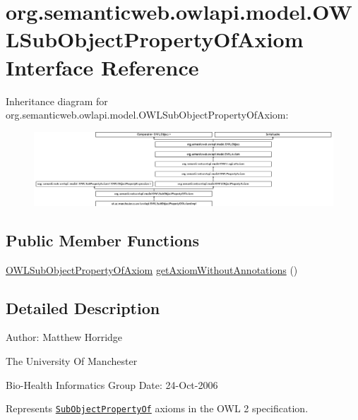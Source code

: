 \hypertarget{interfaceorg_1_1semanticweb_1_1owlapi_1_1model_1_1_o_w_l_sub_object_property_of_axiom}{\section{org.\-semanticweb.\-owlapi.\-model.\-O\-W\-L\-Sub\-Object\-Property\-Of\-Axiom Interface Reference}
\label{interfaceorg_1_1semanticweb_1_1owlapi_1_1model_1_1_o_w_l_sub_object_property_of_axiom}
}
Inheritance diagram for org.\-semanticweb.\-owlapi.\-model.\-O\-W\-L\-Sub\-Object\-Property\-Of\-Axiom\-:\begin{figure}[H]
\begin{center}
\leavevmode
\includegraphics[height=2.780881cm]{interfaceorg_1_1semanticweb_1_1owlapi_1_1model_1_1_o_w_l_sub_object_property_of_axiom}
\end{center}
\end{figure}
\subsection*{Public Member Functions}
\begin{DoxyCompactItemize}
\item 
\hyperlink{interfaceorg_1_1semanticweb_1_1owlapi_1_1model_1_1_o_w_l_sub_object_property_of_axiom}{O\-W\-L\-Sub\-Object\-Property\-Of\-Axiom} \hyperlink{interfaceorg_1_1semanticweb_1_1owlapi_1_1model_1_1_o_w_l_sub_object_property_of_axiom_a7bda39f827be3254b1de75b8fe1cfc08}{get\-Axiom\-Without\-Annotations} ()
\end{DoxyCompactItemize}


\subsection{Detailed Description}
Author\-: Matthew Horridge\par
 The University Of Manchester\par
 Bio-\/\-Health Informatics Group Date\-: 24-\/\-Oct-\/2006 

Represents \href{http://www.w3.org/TR/2009/REC-owl2-syntax-20091027/#Object_Subproperties}{\tt Sub\-Object\-Property\-Of} axioms in the O\-W\-L 2 specification. 

